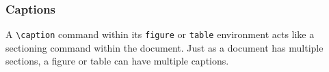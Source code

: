 \documentclass{article}
\newcommand{\justtext}[1]{\texttt{\textbackslash #1}}
\begin{document}
\subsubsection{Captions} 

A \justtext{caption} command within its {\tt figure} or {\tt table} environment acts like a
sectioning command within the document. Just as a document has multiple sections, a figure or table
can have multiple captions.






\end{document}
